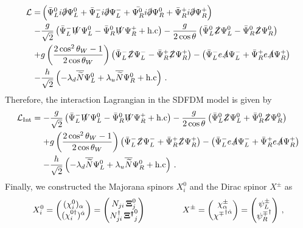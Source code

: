 \begin{align}
\label{eq:lint2}
\mathcal{L} =& 
\left(\bar{\Psi}_L^0i\slashed{\partial}\Psi_L^0+\bar{\Psi}_L^-i\slashed{\partial}\Psi_L^-+\bar{{\Psi}_R^0}i\slashed{\partial}
\Psi_R^0+\bar{\Psi}_R^+i\slashed{\partial}\Psi_R^+\right)\nonumber\\
-&\dfrac{g}{\sqrt{2}}\left(\bar{\Psi}_L^-\slashed{W}\Psi_L^0-\bar{\Psi}_R^0\slashed{W}\Psi_R^++\text{h.c}\right)
- \dfrac{g}{2\cos\theta}\left(\bar{\Psi}_L^0\slashed{Z}\Psi_L^0-\bar{\Psi}_R^0\slashed{Z}\Psi_R^0\right) \nonumber\\
+& g\left(\dfrac{2\cos^2\theta_W-1}{2\cos\theta_W}\right)\left(\bar{\Psi}_L^-\slashed{Z}\Psi_L^--\bar{\Psi}_R^+\slashed{Z}\Psi_R^+\right)
-\left(\bar{\Psi}_L^-e\slashed{A}\Psi_L^-+\bar{\Psi}_R^+e\slashed{A}\Psi_R^+\right)
\nonumber\\
-& \dfrac{h}{\sqrt{2}}\left(-\lambda_d\overline{\widetilde{N}}\Psi_L^0 + \lambda_u\overline{\widetilde{N}}\Psi_R^0+\text{h.c}\right)\,.
\end{align}
Therefore, the interaction Lagrangian in the SDFDM model is given by
\begin{align}
\label{eq:lint3}
\mathcal{L}_{\text{Int}} 
=-&\dfrac{g}{\sqrt{2}}\left(\bar{\Psi}_L^-\slashed{W}\Psi_L^0-\bar{\Psi}_R^0\slashed{W}\Psi_R^++\text{h.c}\right)
- \dfrac{g}{2\cos\theta}\left(\bar{\Psi}_L^0\slashed{Z}\Psi_L^0+\bar{\Psi}_R^0\slashed{Z}\Psi_R^0\right) \nonumber\\
+& g\left(\dfrac{2\cos^2\theta_W-1}{2\cos\theta_W}\right)\left(\bar{\Psi}_L^-\slashed{Z}\Psi_L^-+\bar{\Psi}_R^+\slashed{Z}\Psi_R^+\right)
-\left(\bar{\Psi}_L^-e\slashed{A}\Psi_L^-+\bar{\Psi}_R^+e\slashed{A}\Psi_R^+\right)
\nonumber\\
-& \dfrac{h}{\sqrt{2}}\left(-\lambda_d\overline{\widetilde{N}}\Psi_L^0 + \lambda_u\overline{\widetilde{N}}\Psi_R^0+\text{h.c}\right)\,.
\end{align}
%
Finally, we constructed the Majorana spinors $X_i^0$ and  the Dirac spinor $X^{\pm}$  as
\begin{align}
X_i^0=\begin{pmatrix}
(\chi_{i}^0)_\alpha \\ (\chi_i^{0\dagger})^{\dot{\alpha}}
\end{pmatrix}
=\begin{pmatrix}
N_{ji}\,\boldsymbol{\Xi}^{0}_j \\
N_{ji}^{\dagger}\,\boldsymbol{{\Xi}^{\dagger}}^{0}_j
\end{pmatrix}
\hspace{1.5 cm}
X^{\pm}=\begin{pmatrix}
\chi^{\pm}_{\alpha} \\ {\chi^{\mp}}^{\dagger\dot{\alpha}}
\end{pmatrix}
=\begin{pmatrix}
\psi_L^{\pm} \\
{\psi_R^{\mp}}^{\dagger}
\end{pmatrix}\,,
\end{align}
